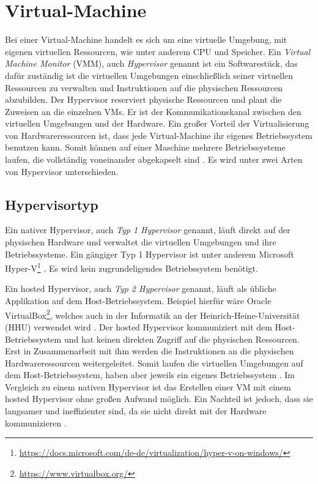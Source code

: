 \section{Virtual-Machine}
Bei einer Virtual-Machine handelt es sich um eine virtuelle Umgebung, mit 
eigenen virtuellen Ressourcen, wie unter anderem CPU und Speicher.
Ein \emph{Virtual Machine Monitor} (VMM), auch \emph{Hypervisor} genannt
ist ein Softwarestück, das dafür zuständig ist die 
virtuellen Umgebungen einschließlich seiner virtuellen Ressourcen zu verwalten
und Instruktionen auf die physischen Ressourcen abzubilden.
Der Hypervisor reserviert physische Ressourcen und plant die Zuweisen
an die einzelnen VMs. Er ist der Kommunikationskanal 
zwischen den virtuellen Umgebungen und der Hardware.
Ein großer Vorteil der Virtualisierung von Hardwareressourcen
ist, dass jede Virtual-Machine ihr eigenes Betriebssystem
benutzen kann. Somit können auf einer Maschine
mehrere Betriebssysteme laufen, die vollständig voneinander abgekapselt sind
\cite{RedHatVM} \cite{RedHatHypervisor}. Es wird unter zwei
Arten von Hypervisor unterschieden.

\subsection{Hypervisortyp}
Ein nativer Hypervisor, auch \emph{Typ 1 Hypervisor} genannt, läuft direkt auf der physischen Hardware
und verwaltet die virtuellen Umgebungen und ihre Betriebssysteme. Ein gängiger Typ 1 Hypervisor ist
unter anderem Microsoft Hyper-V\footnote{\url{https://docs.microsoft.com/de-de/virtualization/hyper-v-on-windows/}}
\cite{RedHatHypervisor}. Es wird kein zugrundeligendes Betriebssystem
benötigt.

Ein hosted Hypervisor, auch \emph{Typ 2 Hypervisor}  genannt, läuft als übliche
Applikation auf dem Host-Betriebssystem. Beispiel hierfür wäre
Oracle VirtualBox\footnote{\url{https://www.virtualbox.org/}},
welches auch in der Informatik
an der Heinrich-Heine-Universität (HHU) verwendet wird \cite{HHUFachschaft}.
Der hosted Hypervisor kommuniziert mit dem Host-Betriebssystem und hat keinen direkten Zugriff auf die
physischen Ressourcen. Erst in Zusammenarbeit mit ihm
werden die Instruktionen an die physischen Hardwareressourcen weitergeleitet.
Somit laufen die virtuellen Umgebungen auf dem Host-Betriebssystem,
haben aber jeweils ein eigenes Betriebssystem \cite{RedHatHypervisor}.
Im Vergleich zu einem nativen Hypervisor ist das Erstellen einer VM
mit einem hosted Hypervisor ohne großen Aufwand möglich.
Ein Nachteil ist jedoch, dass sie langsamer und ineffizienter sind, da sie nicht
direkt mit der Hardware kommunizieren \cite{IBMHypervisor}.

